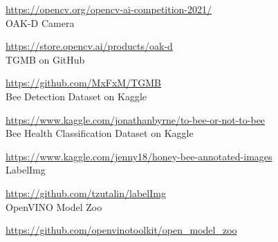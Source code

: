 \documentclass[a4paper,titlepage]{article}
\begin{document}
\href{https://opencv.org/opencv-ai-competition-2021/}{https://opencv.org/opencv-ai-competition-2021/} \\

OAK-D Camera

\href{https://store.opencv.ai/products/oak-d}{https://store.opencv.ai/products/oak-d} \\

TGMB on GitHub

\href{https://github.com/MxFxM/TGMB}{https://github.com/MxFxM/TGMB} \\

Bee Detection Dataset on Kaggle

\href{https://www.kaggle.com/jonathanbyrne/to-bee-or-not-to-bee}{https://www.kaggle.com/jonathanbyrne/to-bee-or-not-to-bee} \\

Bee Health Classification Dataset on Kaggle

\href{https://www.kaggle.com/jenny18/honey-bee-annotated-images}{https://www.kaggle.com/jenny18/honey-bee-annotated-images} \\

LabelImg

\href{https://github.com/tzutalin/labelImg}{https://github.com/tzutalin/labelImg} \\

OpenVINO Model Zoo

\href{https://github.com/openvinotoolkit/open_model_zoo}{https://github.com/openvinotoolkit/open\_model\_zoo} \\
\end{document}
